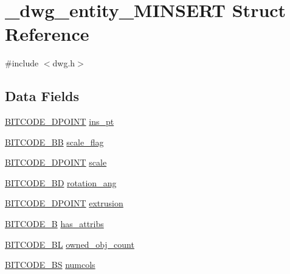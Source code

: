 \hypertarget{struct__dwg__entity__MINSERT}{\section{\-\_\-dwg\-\_\-entity\-\_\-\-M\-I\-N\-S\-E\-R\-T \-Struct \-Reference}
\label{struct__dwg__entity__MINSERT}
}


{\ttfamily \#include $<$dwg.\-h$>$}

\subsection*{\-Data \-Fields}
\begin{DoxyCompactItemize}
\item 
\hyperlink{dwg_8h_a28caf4c2afeb01c45b68490ea6d81113}{\-B\-I\-T\-C\-O\-D\-E\-\_\-D\-P\-O\-I\-N\-T} \hyperlink{struct__dwg__entity__MINSERT_a2fdd82868d9dc78cb9a8299faba0cabf}{ins\-\_\-pt}
\item 
\hyperlink{dwg_8h_a3d492df0a5def6aa68636113e209241f}{\-B\-I\-T\-C\-O\-D\-E\-\_\-\-B\-B} \hyperlink{struct__dwg__entity__MINSERT_a49c4884cad406da618ea158ec7941a66}{scale\-\_\-flag}
\item 
\hyperlink{dwg_8h_a28caf4c2afeb01c45b68490ea6d81113}{\-B\-I\-T\-C\-O\-D\-E\-\_\-D\-P\-O\-I\-N\-T} \hyperlink{struct__dwg__entity__MINSERT_a82755c0f7f5ad31fc6fdf23429ef8af9}{scale}
\item 
\hyperlink{dwg_8h_a3c1e6781466b74ba07785d57da70ed97}{\-B\-I\-T\-C\-O\-D\-E\-\_\-\-B\-D} \hyperlink{struct__dwg__entity__MINSERT_a9e1e336205026681487f1e418371cec4}{rotation\-\_\-ang}
\item 
\hyperlink{dwg_8h_a28caf4c2afeb01c45b68490ea6d81113}{\-B\-I\-T\-C\-O\-D\-E\-\_\-D\-P\-O\-I\-N\-T} \hyperlink{struct__dwg__entity__MINSERT_ab72fbfa44a81548c67b154cc5a858af0}{extrusion}
\item 
\hyperlink{dwg_8h_ab533b1f62d9086749e3bb5b67e9f224e}{\-B\-I\-T\-C\-O\-D\-E\-\_\-\-B} \hyperlink{struct__dwg__entity__MINSERT_a703d3a0bf32ceec5dc560c0f4ef02b92}{has\-\_\-attribs}
\item 
\hyperlink{dwg_8h_aebd5f127038868cbabc3d55d91da776c}{\-B\-I\-T\-C\-O\-D\-E\-\_\-\-B\-L} \hyperlink{struct__dwg__entity__MINSERT_ad26c504b477e1ffa62e8cb0e7a7d5b53}{owned\-\_\-obj\-\_\-count}
\item 
\hyperlink{dwg_8h_a94297606fbd4a4ff97e8add284af0809}{\-B\-I\-T\-C\-O\-D\-E\-\_\-\-B\-S} \hyperlink{struct__dwg__entity__MINSERT_a16acbaf80185b8f02d7ff1e7862058ee}{numcols}

\end{DoxyCompactItemize}
